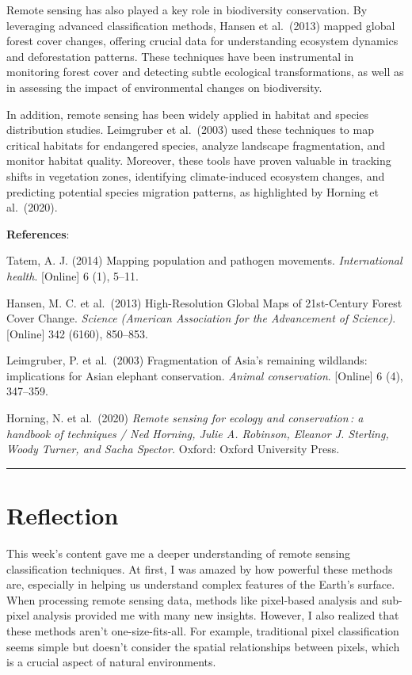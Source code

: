 \documentclass[
  letterpaper,
  DIV=11,
  numbers=noendperiod]{scrreprt}
\begin{document}
Remote sensing has also played a key role in biodiversity conservation.
By leveraging advanced classification methods, Hansen et al.~(2013)
mapped global forest cover changes, offering crucial data for
understanding ecosystem dynamics and deforestation patterns. These
techniques have been instrumental in monitoring forest cover and
detecting subtle ecological transformations, as well as in assessing the
impact of environmental changes on biodiversity.

In addition, remote sensing has been widely applied in habitat and
species distribution studies. Leimgruber et al.~(2003) used these
techniques to map critical habitats for endangered species, analyze
landscape fragmentation, and monitor habitat quality. Moreover, these
tools have proven valuable in tracking shifts in vegetation zones,
identifying climate-induced ecosystem changes, and predicting potential
species migration patterns, as highlighted by Horning et al.~(2020).

\textbf{References}:

Tatem, A. J. (2014) Mapping population and pathogen movements.
\emph{International health}. {[}Online{]} 6 (1), 5--11.

Hansen, M. C. et al.~(2013) High-Resolution Global Maps of 21st-Century
Forest Cover Change. \emph{Science (American Association for the
Advancement of Science)}. {[}Online{]} 342 (6160), 850--853.

Leimgruber, P. et al.~(2003) Fragmentation of Asia's remaining
wildlands: implications for Asian elephant conservation. \emph{Animal
conservation}. {[}Online{]} 6 (4), 347--359.

Horning, N. et al.~(2020) \emph{Remote sensing for ecology and
conservation\,: a handbook of techniques / Ned Horning, Julie A.
Robinson, Eleanor J. Sterling, Woody Turner, and Sacha Spector.} Oxford:
Oxford University Press.

\begin{center}\rule{0.5\linewidth}{0.5pt}\end{center}

\section{Reflection}\label{reflection-5}

This week's content gave me a deeper understanding of remote sensing
classification techniques. At first, I was amazed by how powerful these
methods are, especially in helping us understand complex features of the
Earth's surface. When processing remote sensing data, methods like
pixel-based analysis and sub-pixel analysis provided me with many new
insights. However, I also realized that these methods aren't
one-size-fits-all. For example, traditional pixel classification seems
simple but doesn't consider the spatial relationships between pixels,
which is a crucial aspect of natural environments.
\end{document}
